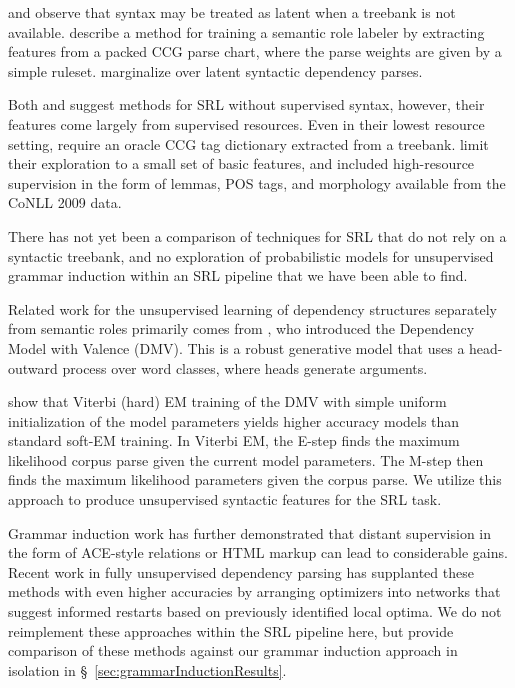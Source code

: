 \documentclass[11pt]{article}
\begin{document}
and  observe that syntax
may be treated as latent when a treebank is not available.
describe a method for training a semantic role labeler by
extracting features from a packed CCG parse chart, where the parse
weights are given by a simple ruleset. 
 marginalize over latent syntactic
dependency parses.

Both  and 
suggest methods for SRL without supervised syntax, however, their 
features come
 largely from supervised resources. Even in their lowest resource
 setting,  require an oracle CCG tag dictionary
 extracted from a treebank.
 limit their exploration to a small set of basic features, and included 
 high-resource supervision in the form of lemmas, POS tags, and 
 morphology available from the CoNLL 
2009 data.  

There has not yet been a comparison of techniques for SRL that do not 
rely on a syntactic treebank, and no exploration of probabilistic models 
for unsupervised grammar induction within an SRL pipeline that we 
have been able to find. 

Related work for the unsupervised 
learning of dependency structures separately from
semantic roles primarily comes from 
, 
who introduced the Dependency Model with Valence (DMV).  
This is a robust generative model that uses a head-outward process over 
word classes, where heads generate arguments.  

 show that Viterbi (hard) EM training 
of the DMV with simple uniform initialization of the model parameters 
yields higher accuracy models than standard soft-EM training. In Viterbi 
EM, the E-step finds the maximum likelihood corpus parse given the 
current model parameters. The M-step then finds the maximum likelihood 
parameters given the corpus parse.  We utilize this approach to
produce unsupervised syntactic features for the SRL task.

Grammar induction work has further demonstrated that distant 
supervision in the form of ACE-style relations \cite{naseem_using_2011} 
or HTML markup \cite{spitkovsky_profiting_2010} can lead to 
considerable gains. Recent work in fully
  unsupervised dependency parsing has supplanted these methods with
 even higher accuracies \cite{spitkovsky_breaking_2013} by arranging 
 optimizers into networks that suggest informed restarts based 
 on previously identified local optima.  We do not
 reimplement these approaches within the SRL pipeline here, but
 provide comparison of these methods against our grammar induction 
 approach in isolation in \S~\ref{sec:grammarInductionResults}.
\end{document}
